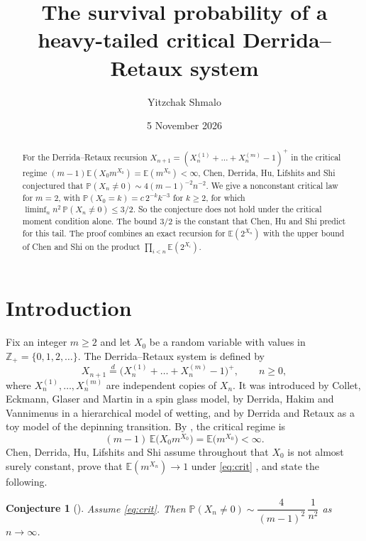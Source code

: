 \documentclass[11pt]{amsart}
\title{The survival probability of a heavy-tailed critical Derrida--Retaux system}
\author{Yitzchak Shmalo}
\date{5 November 2026}
\theoremstyle{definition}
\theoremstyle{remark}
\numberwithin{equation}{section}
\newcommand{\Pp}{\mathbb P}
\newcommand{\E}{\mathbb E}
\newcommand{\Z}{\mathbb Z}
\begin{document}
\begin{abstract}
For the Derrida--Retaux recursion $X_{n+1}=(X_n^{(1)}+\dots+X_n^{(m)}-1)^+$ in the critical regime $(m-1)\E(X_0m^{X_0})=\E(m^{X_0})<\infty$, Chen, Derrida, Hu, Lifshits and Shi conjectured that $\Pp(X_n\ne0)\sim 4(m-1)^{-2}n^{-2}$. We give a nonconstant critical law for $m=2$, with $\Pp(X_0=k)=c\,2^{-k}k^{-3}$ for $k\ge2$, for which $\liminf_n n^2\,\Pp(X_n\ne0)\le 3/2$. So the conjecture does not hold under the critical moment condition alone. The bound $3/2$ is the constant that Chen, Hu and Shi predict for this tail. The proof combines an exact recursion for $\E(2^{X_n})$ with the upper bound of Chen and Shi on the product $\prod_{i<n}\E(2^{X_i})$.
\end{abstract}
\maketitle

\section{Introduction}

Fix an integer $m\ge2$ and let $X_0$ be a random variable with values in $\Z_+=\{0,1,2,\dots\}$. The Derrida--Retaux system is defined by
\begin{equation}\label{eq:rec}
X_{n+1}\overset{d}{=}\bigl(X_n^{(1)}+\dots+X_n^{(m)}-1\bigr)^+,\qquad n\ge0,
\end{equation}
where $X_n^{(1)},\dots,X_n^{(m)}$ are independent copies of $X_n$. It was introduced by Collet, Eckmann, Glaser and Martin \cite{CEGM} in a spin glass model, by Derrida, Hakim and Vannimenus \cite{DHV} in a hierarchical model of wetting, and by Derrida and Retaux \cite{DR} as a toy model of the depinning transition. By \cite{CEGM}, the critical regime is
\begin{equation}\label{eq:crit}
(m-1)\,\E\bigl(X_0m^{X_0}\bigr)=\E\bigl(m^{X_0}\bigr)<\infty .
\end{equation}
Chen, Derrida, Hu, Lifshits and Shi \cite{CDHLS} assume throughout that $X_0$ is not almost surely constant, prove that $\E(m^{X_n})\to1$ under \eqref{eq:crit} \cite[Theorem~2]{CDHLS}, and state the following.

\medskip
\noindent\textbf{Conjecture 1} (\cite{CDHLS}). \emph{Assume \eqref{eq:crit}. Then $\Pp(X_n\ne0)\sim \dfrac{4}{(m-1)^2}\,\dfrac1{n^2}$ as $n\to\infty$.}
\medskip
\end{document}
